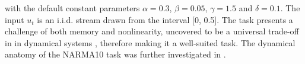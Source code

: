 \noindent with the default constant parameters $\alpha = 0.3$, $\beta = 0.05$,
$\gamma = 1.5$ and $\delta = 0.1$. The input $u_{t}$ is an i.i.d. stream drawn
from the interval [0, 0.5]. The task presents a challenge of both memory and
nonlinearity, uncovered to be a universal trade-off in in dynamical systems
\cite{dambre_information_2012, verstraeten_memory_2010}, therefore making it a
well-suited task. The dynamical anatomy of the NARMA10 task was further
investigated in \cite{kubota_dynamical_2019}.






